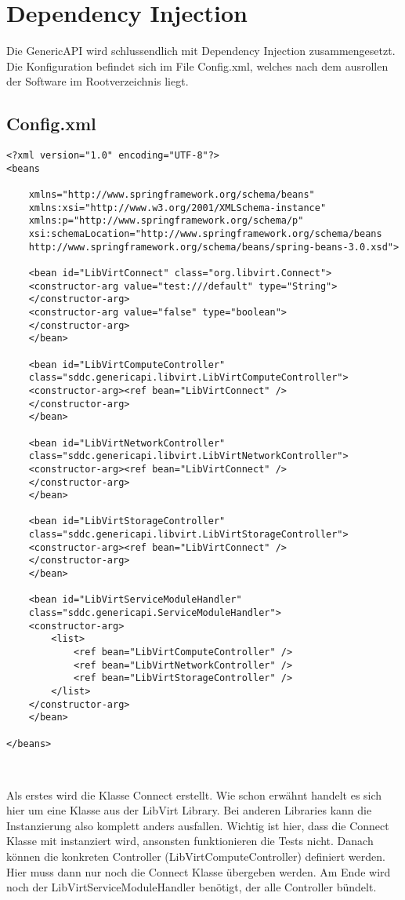 \section{Dependency Injection}
Die GenericAPI wird schlussendlich mit Dependency Injection zusammengesetzt. 
Die Konfiguration befindet sich im File Config.xml, welches nach dem ausrollen der Software
im Rootverzeichnis liegt.

\subsection{Config.xml}
\begin{lstlisting}[style=XML,frame=single,caption={Config.xml}]
<?xml version="1.0" encoding="UTF-8"?>  
<beans  

    xmlns="http://www.springframework.org/schema/beans"  
    xmlns:xsi="http://www.w3.org/2001/XMLSchema-instance"  
    xmlns:p="http://www.springframework.org/schema/p"  
    xsi:schemaLocation="http://www.springframework.org/schema/beans  
    http://www.springframework.org/schema/beans/spring-beans-3.0.xsd">

	<bean id="LibVirtConnect" class="org.libvirt.Connect">
	<constructor-arg value="test:///default" type="String">
	</constructor-arg>
	<constructor-arg value="false" type="boolean">
	</constructor-arg>
	</bean>

	<bean id="LibVirtComputeController" 
	class="sddc.genericapi.libvirt.LibVirtComputeController">
	<constructor-arg><ref bean="LibVirtConnect" />
	</constructor-arg>
	</bean>
	
	<bean id="LibVirtNetworkController" 
	class="sddc.genericapi.libvirt.LibVirtNetworkController">
	<constructor-arg><ref bean="LibVirtConnect" />
	</constructor-arg>
	</bean>
	
	<bean id="LibVirtStorageController" 
	class="sddc.genericapi.libvirt.LibVirtStorageController">
	<constructor-arg><ref bean="LibVirtConnect" />
	</constructor-arg>
	</bean>
	
	<bean id="LibVirtServiceModuleHandler" 
	class="sddc.genericapi.ServiceModuleHandler">
	<constructor-arg>
		<list>
			<ref bean="LibVirtComputeController" />
			<ref bean="LibVirtNetworkController" />
			<ref bean="LibVirtStorageController" />
		</list>
	</constructor-arg>
	</bean>
	             
</beans>



\end{lstlisting}
Als erstes wird die Klasse Connect erstellt. Wie schon erwähnt handelt es sich hier 
um eine Klasse aus der LibVirt Library. Bei anderen Libraries kann die Instanzierung 
also komplett anders ausfallen. Wichtig ist hier, dass die Connect Klasse mit 
instanziert wird, ansonsten funktionieren die Tests nicht. Danach können die konkreten 
Controller (LibVirtComputeController) definiert werden. Hier muss dann nur noch die Connect 
Klasse übergeben werden. Am Ende wird noch der LibVirtServiceModuleHandler benötigt, 
der alle Controller bündelt.\\
